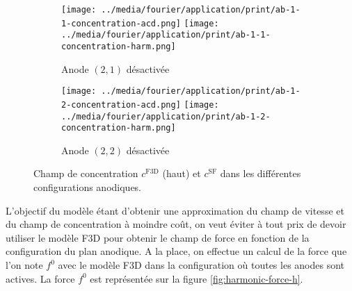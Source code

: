 \begin{figure}[h]
  \begin{center}
    \begin{subfigure}[t]{\textwidth}
      \begin{center}
        \texttt{[image: ../media/fourier/application/print/ab-1-1-concentration-acd.png]}
        \texttt{[image: ../media/fourier/application/print/ab-1-1-concentration-harm.png]}
        \caption{Anode $(2,1)$ désactivée}
        \label{fig:}
      \end{center}
    \end{subfigure}

    \begin{subfigure}[t]{\textwidth}
      \begin{center}
        \texttt{[image: ../media/fourier/application/print/ab-1-2-concentration-acd.png]}
        \texttt{[image: ../media/fourier/application/print/ab-1-2-concentration-harm.png]}
        \caption{Anode $(2,2)$ désactivée}
        \label{fig:}
      \end{center}
    \end{subfigure}


    \caption{Champ de concentration $c^\mathrm{F3D}$ (haut) et
      $c^\mathrm{SF}$ dans les différentes configurations anodiques.}
    \label{fig:harmonic-concentration-comp}
  \end{center}
\end{figure}


L'objectif du modèle étant d'obtenir une approximation du champ de
vitesse et du champ de concentration à moindre coût, on veut
éviter à tout prix de devoir utiliser le modèle F3D pour obtenir
le champ de force en fonction de la configuration du plan anodique. A
la place, on effectue un calcul de la force que l'on note $f^0$ avec
le modèle F3D dans la configuration où toutes les anodes sont
actives. La force $f^0$ est représentée sur la figure \ref{fig:harmonic-force-h}.

